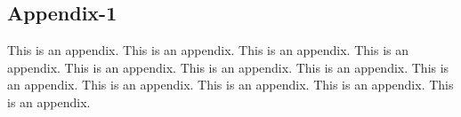 \subsection{Appendix-1}
This is an appendix. This is an appendix. This is an appendix. This is an appendix. This is an appendix. This is an appendix. This is an appendix. This is an appendix. This is an appendix. This is an appendix. This is an appendix. This is an appendix.